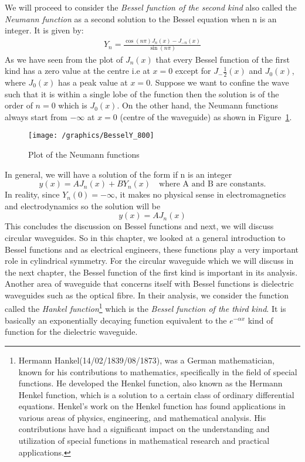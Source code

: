 We will proceed to consider the \emph{Bessel function of the second kind} also called the \emph{Neumann function} as a second solution to the Bessel equation when n is an integer. It is given by: 
\begin{align}
Y_n = \frac{\cos(n\pi) J_n(x) - J_{-n}(x)}{\sin(n\pi)}
\label{eqn:neumannfunctions}
\end{align}
As we have seen from the plot of $J_n(x)$ that every Bessel function of the first kind has a zero value at the centre i.e at $x= 0$ except for $J_-{\frac{1}{2}}(x)$ and $J_0(x)$, where $J_0(x)$ has a peak value at $ x= 0$. Suppose we want to confine the wave such that it is within a single lobe of the function then the solution is of the order of $n =0$ which is $J_0(x)$. On the other hand, the Neumann functions always start from $-\infty$ at $x=0$ (centre of the waveguide) as shown in Figure~\ref{fig:fig-3}.
\begin{figure}[h]
\centering
\texttt{[image: /graphics/BesselY\_800]}
\caption{ Plot of the Neumann functions}
\label{fig:fig-3}
\end{figure}

In general, we will have a solution of the form if n is an integer
\begin{equation*}
y(x) = AJ_n(x) + B Y_n(x)\quad\text{where A and B are constants.}
\end{equation*}
In reality, since $Y_n(0) = -\infty$, it makes no physical sense in electromagnetics and electrodynamics so the solution will be 
\begin{equation}
y(x) = AJ_n(x)
\end{equation}
This concludes the discussion on Bessel functions and next, we will discuss circular waveguides. So in this chapter, we looked at a general introduction to Bessel functions and as electrical engineers, these functions play a very important role in cylindrical symmetry. For the circular waveguide which we will discuss in the next chapter, the Bessel function of the first kind is important in its analysis. Another area of waveguide that concerns itself with Bessel functions is dielectric waveguides such as the optical fibre. In their analysis, we consider the function called the \emph{Hankel function}\footnote{
Hermann Hankel(14/02/1839/08/1873), was a German mathematician, known for his contributions to mathematics, specifically in the field of special functions. He developed the Henkel function, also known as the Hermann Henkel function, which is a solution to a certain class of ordinary differential equations. Henkel's work on the Henkel function has found applications in various areas of physics, engineering, and mathematical analysis. His contributions have had a significant impact on the understanding and utilization of special functions in mathematical research and practical applications.
} which is the \emph{Bessel function of the third kind}. It is basically an exponentially decaying function equivalent to the $e^{-\alpha x}$ kind of function for the dielectric waveguide.
